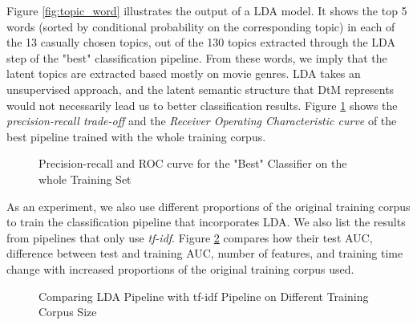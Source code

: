 \documentclass{article}
\begin{document}
Figure \ref{fig:topic_word} illustrates the output of a LDA model. It shows the top 5 words (sorted by conditional probability on the corresponding topic) in each of the 13 casually chosen topics, out of the 130 topics extracted through the LDA step of the "best" classification pipeline. From these words, we imply that the latent topics are extracted based mostly on movie genres. LDA takes an unsupervised approach, and the latent semantic structure that DtM represents would not necessarily lead us to better classification results. Figure \ref{fig:pr_roc} shows the \emph{precision-recall trade-off} and the \emph{Receiver Operating Characteristic curve} of the best pipeline trained with the whole training corpus.

\begin{figure}[h!]
  \centering
  \caption{Precision-recall and ROC curve for the "Best" Classifier on the whole Training Set}
  \label{fig:pr_roc}
\end{figure}

As an experiment, we also use different proportions of the original training corpus to train the classification pipeline that incorporates LDA. We also list the results from pipelines that only use \emph{tf-idf}. Figure \ref{fig:comp} compares how their test AUC, difference between test and training AUC, number of features, and training time change with increased proportions of the original training corpus used.

\begin{figure}[h!]
  \centering
  \caption{Comparing LDA Pipeline with tf-idf Pipeline on Different Training Corpus Size}
  \label{fig:comp}
\end{figure}
\end{document}
